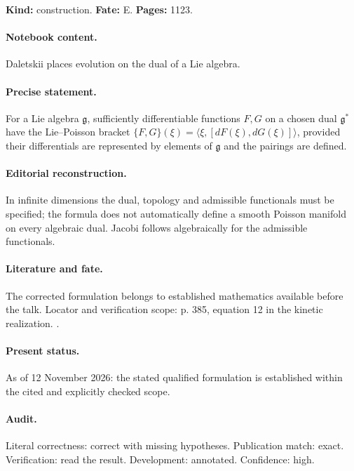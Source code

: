 \label{item:1983-602.1}

\noindent\textbf{Kind:} construction. \textbf{Fate:} E. \textbf{Pages:} 1123.\par

\paragraph{Notebook content.} Daletskii places evolution on the dual of a Lie algebra.

\paragraph{Precise statement.} For a Lie algebra \(\mathfrak g\), sufficiently differentiable functions \(F,G\) on a chosen dual \(\mathfrak g^*\) have the Lie--Poisson bracket \(\{F,G\}(\xi)=\langle\xi,[dF(\xi),dG(\xi)]\rangle\), provided their differentials are represented by elements of \(\mathfrak g\) and the pairings are defined.

\paragraph{Editorial reconstruction.} In infinite dimensions the dual, topology and admissible functionals must be specified; the formula does not automatically define a smooth Poisson manifold on every algebraic dual. Jacobi follows algebraically for the admissible functionals.

\paragraph{Literature and fate.} The corrected formulation belongs to established mathematics available before the talk. Locator and verification scope: p. 385, equation 12 in the kinetic realization. \cite{morrison1980maxwell}.

\paragraph{Present status.} As of 12 November 2026: the stated qualified formulation is established within the cited and explicitly checked scope.

\paragraph{Audit.} Literal correctness: correct with missing hypotheses. Publication match: exact. Verification: read the result. Development: annotated. Confidence: high.

